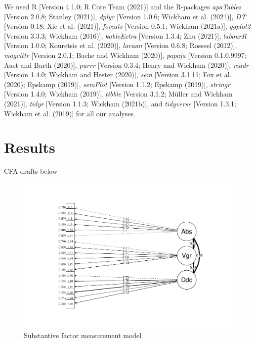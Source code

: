 \documentclass[
  english,
  man]{apa7}
\begin{document}
We used R {[}Version 4.1.0; R Core Team (2021){]} and the R-packages \emph{apaTables} {[}Version 2.0.8; Stanley (2021){]}, \emph{dplyr} {[}Version 1.0.6; Wickham et al. (2021){]}, \emph{DT} {[}Version 0.18; Xie et al. (2021){]}, \emph{forcats} {[}Version 0.5.1; Wickham (2021a){]}, \emph{ggplot2} {[}Version 3.3.3; Wickham (2016){]}, \emph{kableExtra} {[}Version 1.3.4; Zhu (2021){]}, \emph{labourR} {[}Version 1.0.0; Kouretsis et al. (2020){]}, \emph{lavaan} {[}Version 0.6.8; Rosseel (2012){]}, \emph{magrittr} {[}Version 2.0.1; Bache and Wickham (2020){]}, \emph{papaja} {[}Version 0.1.0.9997; Aust and Barth (2020){]}, \emph{purrr} {[}Version 0.3.4; Henry and Wickham (2020){]}, \emph{readr} {[}Version 1.4.0; Wickham and Hester (2020){]}, \emph{sem} {[}Version 3.1.11; Fox et al. (2020); Epskamp (2019){]}, \emph{semPlot} {[}Version 1.1.2; Epskamp (2019){]}, \emph{stringr} {[}Version 1.4.0; Wickham (2019){]}, \emph{tibble} {[}Version 3.1.2; Müller and Wickham (2021){]}, \emph{tidyr} {[}Version 1.1.3; Wickham (2021b){]}, and \emph{tidyverse} {[}Version 1.3.1; Wickham et al. (2019){]} for all our analyses.

\hypertarget{results}{%
\section{Results}\label{results}}

CFA drafts below

\begin{figure}
\centering
\includegraphics{SIOPpapaja_files/figure-latex/CFAatt1-1.pdf}
\caption{\label{fig:CFAatt1}Substantive factor measurement model}
\end{figure}
\end{document}
